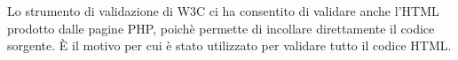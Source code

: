 Lo strumento di validazione di W3C ci ha consentito di validare anche l’HTML prodotto dalle pagine PHP, poichè permette di incollare
direttamente il codice sorgente. È il motivo per cui è stato utilizzato per validare tutto il codice HTML.